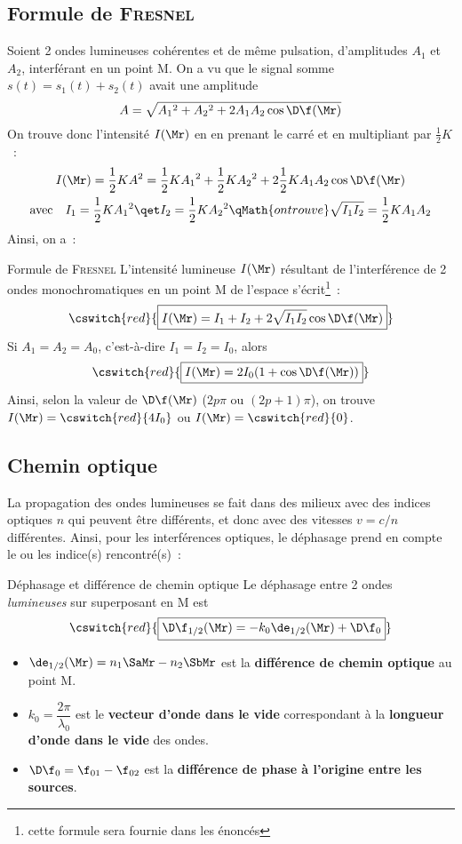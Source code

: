 \documentclass[../main/main.tex]{subfiles}
\begin{document}
\subsection{Formule de \textsc{Fresnel}}
Soient 2 ondes lumineuses cohérentes et de même pulsation, d'amplitudes $A_1$ et
$A_2$, interférant en un point M. On a vu que le signal somme $s(t) = s_1(t) +
s_2(t)$ avait une amplitude
\[A = \sqrt{A_1{}^2 + A_2{}^2 + 2A_1A_2\cos\D\f(\Mr)}\]
On trouve donc l'intensité $I(\Mr)$ en en prenant le carré et en multipliant par
$\frac{1}{2}K$~:
\begin{gather*}
    I(\Mr)
    = \frac{1}{2}KA^2
    = \frac{1}{2}KA_1{}^2 + \frac{1}{2}KA_2{}^2 +
    2\frac{1}{2}KA_1A_2\cos\D\f(\Mr)\\
    \text{avec}\quad
    I_1 = \frac{1}{2}KA_1{}^2
    \qet
    I_2 = \frac{1}{2}KA_2{}^2
    \qMath{on trouve}
    \sqrt{I_1I_2} = \frac{1}{2}KA_1A_2
\end{gather*}
Ainsi, on a~:
\begin{NCprop}[hand]{Formule de \textsc{Fresnel}}
    L'intensité lumineuse $I(\Mr)$ résultant de l'interférence de 2 ondes
    monochromatiques en un point M de l'espace s'écrit\footnote{cette formule
    sera fournie dans les énoncés}~:
    \[\cswitch{red}{\boxed{I(\Mr) = I_1 + I_2 + 2\sqrt{I_1I_2}\cos\D\f(\Mr)}}\]
    Si $A_1 = A_2 = A_0$, c'est-à-dire $I_1 = I_2 = I_0$, alors
    \[\cswitch{red}{\boxed{I(\Mr) = 2I_0(1+\cos\D\f(\Mr))}}\]
    Ainsi, selon la valeur de $\D\f(\Mr)$ ($2p\pi$ ou $(2p+1)\pi$), on trouve
    $I(\Mr) = \cswitch{red}{4I_0}$ ou $I(\Mr) = \cswitch{red}{0}$.
\end{NCprop}

\vspace{-10pt}
\subsection{Chemin optique}
La propagation des ondes lumineuses se fait dans des milieux avec des indices
optiques $n$ qui peuvent être différents, et donc avec des vitesses $v = c/n$
différentes. Ainsi, pour les interférences optiques, le déphasage prend en
compte le ou les indice(s) rencontré(s)~:

\begin{NCprop}[heart]{Déphasage et différence de chemin optique}
    Le déphasage entre 2 ondes \textit{lumineuses} sur superposant en M est
    \[\cswitch{red}{\boxed{\D\f_{1/2}(\Mr) = -k_0\de_{1/2}(\Mr) + \D\f_0}}\]
    \begin{itemize}
        \item $\de_{1/2}(\Mr) = n_1\SaMr - n_2\SbMr$ est la \textbf{différence de
            chemin optique} au point M.
        \item $k_0 = \dfrac{2\pi}{\lambda_0}$ est le \textbf{vecteur d'onde dans
            le vide} correspondant à la \textbf{longueur d'onde dans le vide}
            des ondes.
        \item $\D\f_0 = \f_{01}-\f_{02}$ est la \textbf{différence de phase à
            l'origine entre les sources}.
    \end{itemize}
\end{NCprop}
\end{document}
